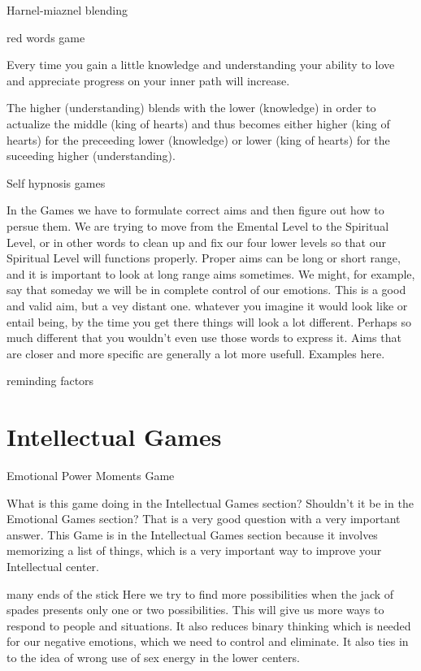 \documentclass[12pt,letterpaper]{book}
\begin{document}
Harnel-miaznel blending

red words game

Every time you gain a little knowledge and understanding your ability to love and appreciate progress on your inner path will increase.

The higher (understanding) blends with the lower (knowledge) in order to actualize the middle (king of hearts) and thus becomes either higher (king of hearts) for the preceeding lower (knowledge) or lower (king of hearts) for the suceeding higher (understanding). 

Self hypnosis games

In the Games we have to formulate correct aims and then figure out how to persue them. We are trying to move from the Emental Level to the Spiritual Level, or in other words to clean up and fix our four lower levels so that our Spiritual Level will functions properly. Proper aims can be long or short range, and it is important to look at long range aims sometimes. We might, for example, say that someday we will be in complete control of our emotions. This is a good and valid aim, but a vey distant one.  whatever you imagine it would look like or entail being, by the time you get there things will look a lot different. Perhaps so much different that you wouldn't even use those words to express it. Aims that are closer and more specific are generally a lot more usefull. Examples here.

reminding factors

\section{Intellectual Games}

Emotional Power Moments Game

What is this game doing in the Intellectual Games section? Shouldn't it be in the Emotional Games section? That is a very good question with a very important answer. This Game is in the Intellectual Games section because it involves memorizing a list of things, which is a very important way to improve your Intellectual center. 

many ends of the stick
Here we try to find more possibilities when the jack of spades presents only one or two possibilities. This will give us more ways to respond to people and situations. It also reduces binary thinking which is needed for our negative emotions, which we need to control and eliminate. It also ties in to the idea of wrong use of sex energy in the lower centers.
\end{document}
